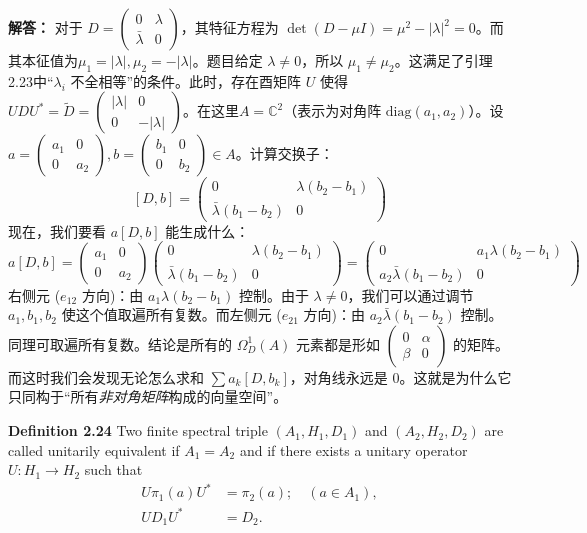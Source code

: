 \textbf{解答：} 对于 $D = \begin{pmatrix} 0 & \lambda \\ \bar{\lambda} & 0 \end{pmatrix}$，其特征方程为 $\det(D - \mu I) = \mu^2 - |\lambda|^2 = 0$。而其本征值为$\mu_1 = |\lambda|, \mu_2 = -|\lambda|$。题目给定 $\lambda \neq 0$，所以 $\mu_1 \neq \mu_2$。这满足了引理2.23中“$\lambda_i$ 不全相等”的条件。此时，存在酉矩阵 $U$ 使得 $U D U^* = \tilde{D} = \begin{pmatrix} |\lambda| & 0 \\ 0 & -|\lambda| \end{pmatrix}$。在这里$A = \mathbb{C}^2$（表示为对角阵 $\text{diag}(a_1, a_2)$）。设 $a = \begin{pmatrix} a_1 & 0 \\ 0 & a_2 \end{pmatrix}, b = \begin{pmatrix} b_1 & 0 \\ 0 & b_2 \end{pmatrix} \in A$。计算交换子：
\[[D, b] = \begin{pmatrix} 0 & \lambda(b_2 - b_1) \\ \bar{\lambda}(b_1 - b_2) & 0 \end{pmatrix}\]
现在，我们要看 $a[D, b]$ 能生成什么：
\[a[D, b] = \begin{pmatrix} a_1 & 0 \\ 0 & a_2 \end{pmatrix} \begin{pmatrix} 0 & \lambda(b_2 - b_1) \\ \bar{\lambda}(b_1 - b_2) & 0 \end{pmatrix} = \begin{pmatrix} 0 & a_1 \lambda(b_2 - b_1) \\ a_2 \bar{\lambda}(b_1 - b_2) & 0 \end{pmatrix}\]
右侧元 ($e_{12}$ 方向)：由 $a_1 \lambda (b_2 - b_1)$ 控制。由于 $\lambda \neq 0$，我们可以通过调节 $a_1, b_1, b_2$ 使这个值取遍所有复数。而左侧元 ($e_{21}$ 方向)：由 $a_2 \bar{\lambda} (b_1 - b_2)$ 控制。同理可取遍所有复数。结论是所有的 $\Omega_D^1(A)$ 元素都是形如 $\begin{pmatrix} 0 & \alpha \\ \beta & 0 \end{pmatrix}$ 的矩阵。而这时我们会发现无论怎么求和 $\sum a_k [D, b_k]$，对角线永远是 0。这就是为什么它只同构于“所有\textit{非对角矩阵}构成的向量空间”。

\textbf{Definition 2.24} Two finite spectral triple $(A_1, H_1, D_1)$ and $(A_2, H_2, D_2)$ are called unitarily equivalent if $A_1=A_2$ and if there exists a unitary operator $U:H_1\rightarrow H_2$ such that
\[
\begin{split}
    U\pi_1(a)U^*&=\pi_2(a); \quad (a\in A_1), \\
    UD_1U^* &= D_2.
\end{split}
\]

